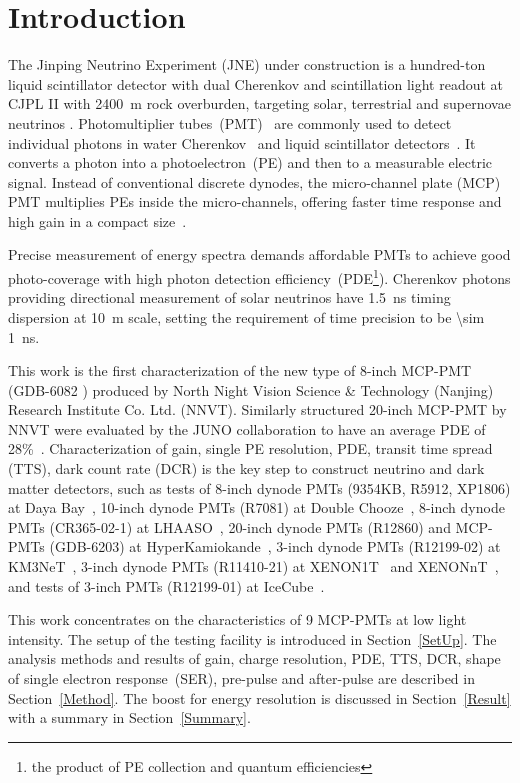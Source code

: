 \section{Introduction}
The Jinping Neutrino Experiment (JNE) under construction is a hundred-ton liquid scintillator detector with dual Cherenkov and scintillation light readout
 at CJPL II with \SI{2400}{m} rock overburden, targeting solar, terrestrial and supernovae neutrinos \cite{LetterJNE2017,xu_jinping_2020,xu_innovations_2022,xu_design_2022}.
Photomultiplier tubes~(PMT)~\cite{HAMAMATSUManual} are commonly used to detect individual photons in water Cherenkov~\cite{SNO,SuperK} and liquid scintillator detectors~\cite{KamLAND,JUNO:2015zny}. It converts a photon into a photoelectron~(PE) and then to a measurable electric signal.  Instead of conventional discrete dynodes, the micro-channel plate (MCP) PMT multiplies PEs inside the micro-channels, offering faster time response and high gain in a compact size~\cite{HAMAMATSUManual}.

Precise measurement of energy spectra demands affordable PMTs to achieve good photo-coverage with high photon detection efficiency~(PDE\footnote{the product of PE collection and quantum efficiencies}). Cherenkov photons providing directional measurement of solar neutrinos have \SI{1.5}{ns} timing dispersion at \SI{10}{m} scale, setting the requirement of time precision to be \SI{\sim 1}{ns}.


This work is the first characterization of
 the new type of 8-inch MCP-PMT (GDB-6082 \cite{GDB-6082}) produced by North Night Vision Science \& Technology (Nanjing) Research Institute Co. Ltd. (NNVT). %
Similarly structured 20-inch MCP-PMT by NNVT were evaluated by the JUNO collaboration to have an average PDE of 28\%~\cite{JUNOMassTesting}.
Characterization of gain, single PE resolution, PDE, transit time spread (TTS), dark count rate (DCR) is the key step to construct neutrino and dark matter detectors, such as tests of
 8-inch dynode PMTs (9354KB, R5912, XP1806) at Daya Bay~\cite{DayaBayTesting}, 10-inch dynode PMTs (R7081) at Double Chooze~\cite{DoubleChoozeTesting}, 8-inch dynode PMTs (CR365-02-1) at LHAASO~\cite{LHAASOTesting}, 20-inch dynode PMTs (R12860) and MCP-PMTs (GDB-6203) at HyperKamiokande~\cite{HyperKTesting}, 3-inch dynode PMTs (R12199-02) at KM3NeT~\cite{KM3NetTesting}, 3-inch dynode PMTs (R11410-21) at XENON1T~\cite{XENON1TTesting} and XENONnT~\cite{XENONnTTesting}, and tests of 3-inch PMTs (R12199-01) at IceCube~\cite{IceCubeTesting}.

This work concentrates on the characteristics of 9 MCP-PMTs at low light intensity. The setup of the testing facility is introduced in Section~\ref{SetUp}. The analysis methods and results of gain, charge resolution, PDE, TTS, DCR, shape of single electron response~(SER), pre-pulse and after-pulse are described in Section~\ref{Method}. The boost for energy resolution is discussed in Section~\ref{Result} with a summary in Section~\ref{Summary}.
